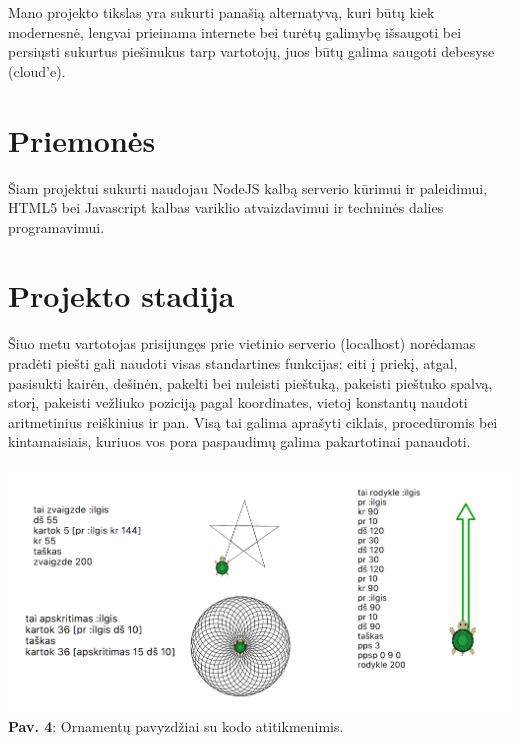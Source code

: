 \documentclass[a4paper,12pt]{article}
\begin{document}
Mano projekto tikslas yra sukurti panašią alternatyvą, kuri būtų kiek modernesnė, lengvai prieinama internete bei turėtų galimybę išsaugoti bei persiųsti sukurtus piešinukus tarp vartotojų, juos būtų galima saugoti debesyse (cloud'e). \\

\section{Priemonės}

Šiam projektui sukurti naudojau NodeJS kalbą serverio kūrimui ir paleidimui, HTML5 bei Javascript kalbas variklio atvaizdavimui ir techninės dalies programavimui. \\

\section{Projekto stadija}

Šiuo metu vartotojas prisijungęs prie vietinio serverio (localhost) norėdamas pradėti piešti gali naudoti visas standartines funkcijas: eiti į priekį, atgal, pasisukti kairėn, dešinėn, pakelti bei nuleisti pieštuką, pakeisti pieštuko spalvą, storį, pakeisti vežliuko poziciją pagal koordinates, vietoj konstantų naudoti aritmetinius reiškinius ir pan.
Visą tai galima aprašyti ciklais, procedūromis bei kintamaisiais, kuriuos vos pora paspaudimų galima pakartotinai panaudoti. \\

\begin{center}
\includegraphics[scale=0.55]{ManoPvz1.png}\\
\textbf{Pav. 4}: Ornamentų pavyzdžiai su kodo atitikmenimis.\\
\end{center}
\end{document}
